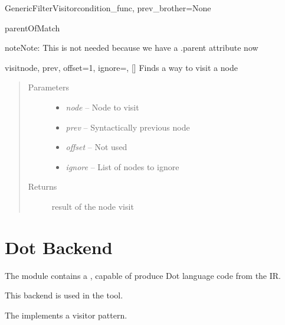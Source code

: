 \documentclass[a4paper,10pt,english]{manual}
\begin{document}
\begin{classdesc}{GenericFilterVisitor}{condition\_func, prev\_brother=None}
\begin{methoddesc}{parentOfMatch}{}
\begin{notice}{note}{Note:}
This is not needed because we have a .parent attribute now
\end{notice}
\end{methoddesc}

\hypertarget{Backends.Common.Visitors.GenericVisitors.GenericFilterVisitor.visit}{}\begin{methoddesc}{visit}{node, prev, offset=1, ignore=, {[}{]}}
Finds a way to visit a node
\begin{quote}\begin{description}
\item[Parameters] \leavevmode\begin{itemize}
\item {} 
\emph{node} -- Node to visit

\item {} 
\emph{prev} -- Syntactically previous node

\item {} 
\emph{offset} -- Not used

\item {} 
\emph{ignore} -- List of nodes to ignore

\end{itemize}

\item[Returns] \leavevmode
result of the node visit

\end{description}\end{quote}
\end{methoddesc}
\end{classdesc}

\resetcurrentobjects
\hypertarget{--doc-dotbackend}{}

\section{Dot Backend}
\hypertarget{module-DotBackend}{}
The \hyperlink{module-DotBackend}{} module contains a , capable of
produce Dot language code from the IR.

This backend is used in the  tool.

The  implements a visitor pattern.
\hypertarget{module-Backends.DotBackend.Writers.DotWriter}{}
\modulesynopsis{}
\end{document}
